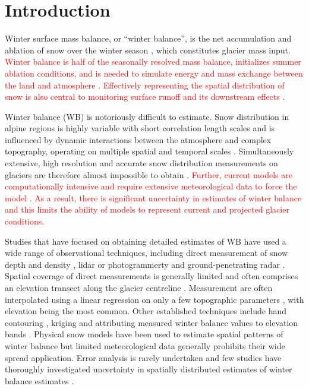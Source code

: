 \documentclass[twocolumn, letterpaper]{igs}
\begin{document}
\section{Introduction}

Winter surface mass balance, or ``winter balance'', is the net accumulation and ablation of snow over the winter season \citep{Cogley2011}, which constitutes glacier mass input. \textcolor{red}{Winter balance is half of the seasonally resolved mass balance, initializes summer ablation conditions, and is needed to simulate energy and mass exchange between the land and atmosphere \citep[e.g.][]{Hock2005,Reveillet2016}. Effectively representing the spatial distribution of snow is also central to monitoring surface runoff and its downstream effects \citep[e.g.][]{Clark2011}.}

Winter balance (WB) is notoriously difficult to estimate. Snow distribution in alpine regions is highly variable with short correlation length scales \citep[e.g.][]{Anderton2004, Egli2011, Grunewald2010, Helbig2017, Lopez2011, Lopez2013, Machguth2006, Marshall2006} and is influenced by dynamic interactions between the atmosphere and complex topography, operating on multiple spatial and temporal scales \citep[e.g.][]{Barry1992, Liston2006, Clark2011}. Simultaneously extensive, high resolution and accurate snow distribution measurements on glaciers are therefore almost impossible to obtain \citep[e.g.][]{Cogley2011, McGrath2015}. \textcolor{red}{Further, current models are computationally intensive and require extensive meteorological data to force the model \citep{Dadic2010}. As a result, there is significant uncertainty in estimates of winter balance and this limits the ability of models to represent current and projected glacier conditions.}

Studies that have focused on obtaining detailed estimates of WB have used a wide range of observational techniques, including direct measurement of snow depth and density \citep[e.g.][]{Cullen2017}, lidar or photogrammerty \citep[e.g.][]{Sold2013} and ground-penetrating radar \citep[e.g.][]{Machguth2006, Gusmeroli2014, McGrath2015}. Spatial coverage of direct measurements is generally limited and often comprises an elevation transect along the glacier centreline \citep[e.g.][]{Kaser2003}. Measurement are often interpolated using a linear regression on only a few topographic parameters \citep[e.g.][]{MacDougall2011}, with elevation being the most common. Other established techniques include hand contouring \citep[e.g.][]{Tangborn1975}, kriging \citep[e.g.][]{Hock1999} and attributing measured winter balance values to elevation bands \citep[e.g.][]{Thibert2008}. Physical snow models have been used to estimate spatial patterns of winter balance \citep[e.g.][]{Mott2008, Schuler2008, Dadic2010} but limited meteorological data generally prohibits their wide spread application. Error analysis is rarely undertaken and few studies have thoroughly investigated uncertainty in spatially distributed estimates of winter balance estimates \citep[c.f.][]{Schuler2008}. 
\end{document}
